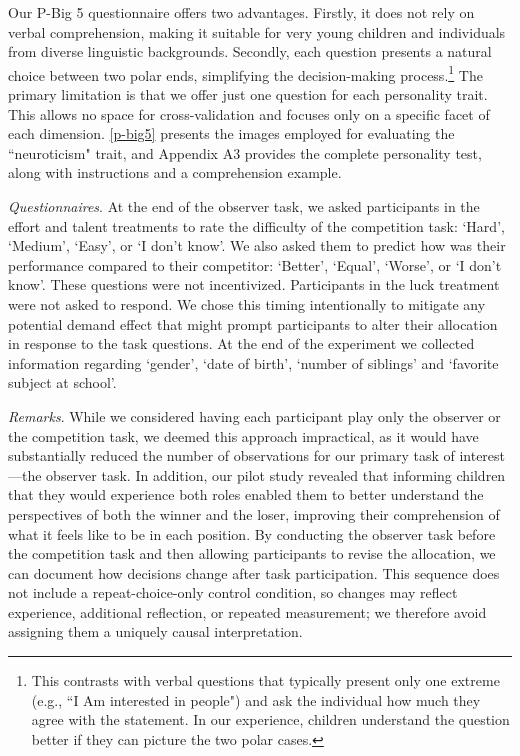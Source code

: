 \documentclass[11pt]{article}
\begin{document}
Our P-Big 5 questionnaire offers two advantages. Firstly, it does not rely on verbal comprehension, making it suitable for very young children and individuals from diverse linguistic backgrounds. Secondly, each question presents a natural choice between two polar ends, simplifying the decision-making process.\footnote{This contrasts with verbal questions that typically present only one extreme (e.g., ``I Am interested in people") and ask the individual how much they agree with the statement. In our experience, children understand the question better if they can picture the two polar cases.} The primary limitation is that we offer just one question for each personality trait. This allows no space for cross-validation and focuses only on a specific facet of each dimension. \autoref{p-big5} presents the images employed for evaluating the ``neuroticism" trait, and Appendix A3 provides the complete personality test, along with instructions and a comprehension example.


\medskip


\emph{Questionnaires}. At the end of the observer task, we asked participants in the effort and talent treatments to rate the difficulty of the competition task: ‘Hard’, ‘Medium’, ‘Easy’, or ‘I don’t know’. We also asked them to predict how was their performance compared to their competitor: ‘Better’, ‘Equal’, ‘Worse’, or ‘I don’t know’. These questions were not incentivized. Participants in the luck treatment were not asked to respond. 
We chose this timing intentionally to mitigate any potential demand effect that might prompt participants to alter their allocation in response to the task questions. At the end of the experiment we collected information regarding `gender', `date of birth', `number of siblings' and `favorite subject at school'. \par \medskip

 
\emph{Remarks}. While we considered having each participant play only the observer or the competition task, we deemed this approach impractical, as it would have substantially reduced the number of observations for our primary task of interest---the observer task. In addition, our pilot study revealed that informing children that they would experience both roles enabled them to better understand the perspectives of both the winner and the loser, improving their comprehension of what it feels like to be in each position. By conducting the observer task before the competition task and then allowing participants to revise the allocation, we can document how decisions change after task participation. This sequence does not include a repeat-choice-only control condition, so changes may reflect experience, additional reflection, or repeated measurement; we therefore avoid assigning them a uniquely causal interpretation.
 
\end{document}
